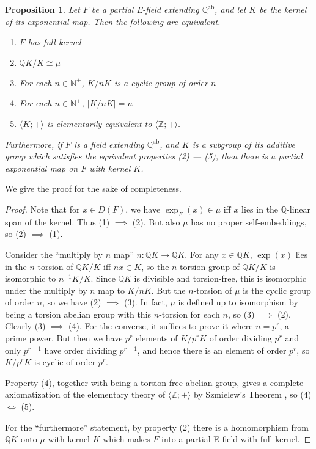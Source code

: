 \documentclass[12pt]{amsart}
\newtheorem{prop}{Proposition}[section]
\theoremstyle{definition}
\begin{document}
\begin{prop}
  Let $F$ be a partial E-field extending ${{\ensuremath{\mathbb{Q}}}^{\mathrm{ab}}}$, and let $K$ be the kernel of its exponential map. Then the following are equivalent.
\begin{enumerate}
  \item $F$ has full kernel
  \item ${\ensuremath{\mathbb{Q}}} K/K {\cong} \mu$
  \item For each $n \in {\ensuremath{\mathbb{N}}}^+$, $K/nK$ is a cyclic group of order $n$
  \item For each $n \in {\ensuremath{\mathbb{N}}}^+$, $|K/nK| = n$
  
  
  \item ${\ensuremath{\langle {K;+} \rangle}}$ is elementarily equivalent to ${\ensuremath{\langle {{\ensuremath{\mathbb{Z}}};+} \rangle}}$.
\end{enumerate}
Furthermore, if $F$ is a field extending ${{\ensuremath{\mathbb{Q}}}^{\mathrm{ab}}}$, and $K$ is a subgroup of its additive group which satisfies the equivalent properties (2) --- (5), then there is a partial exponential map on $F$ with kernel $K$.
\end{prop}
We give the proof for the sake of completeness.
\begin{proof}
Note that for $x \in D(F)$, we have $\exp_F(x) \in \mu$ iff $x$ lies in the ${\ensuremath{\mathbb{Q}}}$-linear span of the kernel. Thus (1) $\implies$ (2). But also $\mu$ has no proper self-embeddings, so (2) $\implies$ (1).

Consider the ``multiply by $n$ map'' $n : {\ensuremath{\mathbb{Q}}} K \to {\ensuremath{\mathbb{Q}}} K$. For any $x \in {\ensuremath{\mathbb{Q}}} K$, $\exp(x)$ lies in the $n$-torsion of ${\ensuremath{\mathbb{Q}}} K/K$ iff $nx \in K$, so the $n$-torsion group of ${\ensuremath{\mathbb{Q}}} K/K$ is isomorphic to $n^{-1}K/K$. Since ${\ensuremath{\mathbb{Q}}} K$ is divisible and torsion-free, this is isomorphic under the multiply by $n$ map to $K/nK$. But the $n$-torsion of $\mu$ is the cyclic group of order $n$, so we have (2) $\implies$ (3). In fact, $\mu$ is defined up to isomorphism by being a torsion abelian group with this $n$-torsion for each $n$, so (3) $\implies$ (2). Clearly (3) $\implies$ (4). For the converse, it suffices to prove it where $n = p^r$, a prime power. But then we have $p^r$ elements of $K/p^r K$ of order dividing $p^r$ and only $p^{r-1}$ have order dividing $p^{r-1}$, and hence there is an element of order $p^r$, so $K/p^r K$ is cyclic of order $p^r$.

Property (4), together with being a torsion-free abelian group, gives a complete axiomatization of the elementary theory of ${\ensuremath{\langle {{\ensuremath{\mathbb{Z}}};+} \rangle}}$ by Szmielew's Theorem \cite[Theorem A.2.7]{Hodges93}, so (4) $\iff$ (5).

For the ``furthermore'' statement, by property (2) there is a homomorphism from ${\ensuremath{\mathbb{Q}}} K$ onto $\mu$ with kernel $K$ which makes $F$ into a partial E-field with full kernel.
\end{proof}
\end{document}
